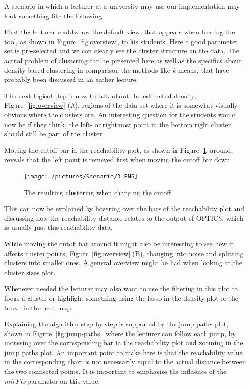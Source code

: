 \documentclass{vgtc} %
\begin{document}
A scenario in which a lecturer at a university may use our implementation may
look something like the following.

First the lecturer could show the default view, that appears when loading the
tool, as shown in Figure~\ref{fig:overview}, to his students. Here a good
parameter set is pre-selected and we can clearly see the cluster structure on
the data. The actual problem of clustering can be presented here as well as the
specifics about density based clustering in comparison the methods like
$k$-means, that have probably been discussed in an earlier lecture.

The next logical step is now to talk about the estimated density,
Figure~\ref{fig:overview} (A), regions of the data set where it is somewhat
visually obvious where the clusters are. An interesting question for the
students would now be if they think, the left- or rightmost point in the bottom
right cluster should still be part of the cluster.

Moving the cutoff bar in the reachability plot, as shown in
Figure~\ref{fig:reachability-plot}, around, reveals that the left point is
removed first when moving the cutoff bar down.

\begin{figure}[tb]
    \centering
    \texttt{[image: /pictures/Scenario/3.PNG]}
    \caption{The resulting clustering when changing the cutoff}
    \label{fig:reachability-plot}
\end{figure}

This can now be explained by hovering over the bars of the reachability plot
and discussing how the reachability distance relates to the output of OPTICS,
which is usually just this reachability data.

While moving the cutoff bar around it might also be interesting to see how it
affects cluster points, Figure~\ref{fig:overview} (B), changing into noise and
splitting clusters into smaller ones. A general overview might be had when
looking at the cluster sizes plot.

Whenever needed the lecturer may also want to use the filtering in this plot to
focus a cluster or highlight something using the lasso in the density plot
or the brush in the heat map.

Explaining the algorithm step by step is supported by the jump paths plot, shown in
Figure~\ref{fig:jump-paths}, where the lecturer can follow each jump, by
moussing over the corresponding bar in the reachability plot and zooming in the
jump paths plot. An important point to make here is that the reachability value
in the corresponding chart is not necessarily equal to the actual distance
between the two connected points. It is important to emphasize the influence of
the \emph{minPts} parameter on this value.
\end{document}
